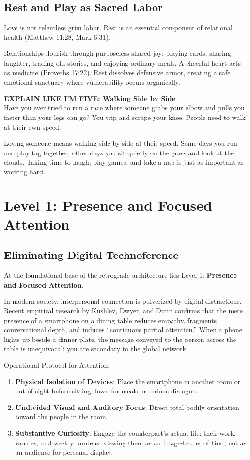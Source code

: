 \documentclass[11pt,twocolumn]{article}
\begin{document}
\subsection{Rest and Play as Sacred Labor}
Love is not relentless grim labor. Rest is an essential component of relational health (Matthew 11:28, Mark 6:31).

Relationships flourish through purposeless shared joy: playing cards, sharing laughter, trading old stories, and enjoying ordinary meals. A cheerful heart acts as medicine (Proverbs 17:22). Rest dissolves defensive armor, creating a safe emotional sanctuary where vulnerability occurs organically.

\begin{eli5box}
\textbf{EXPLAIN LIKE I'M FIVE: Walking Side by Side}\\
Have you ever tried to run a race where someone grabs your elbow and pulls you faster than your legs can go? You trip and scrape your knee. People need to walk at their own speed. 

Loving someone means walking side-by-side at their speed. Some days you run and play tag together; other days you sit quietly on the grass and look at the clouds. Taking time to laugh, play games, and take a nap is just as important as working hard.
\end{eli5box}

\section{Level 1: Presence and Focused Attention}

\subsection{Eliminating Digital Technoference}
At the foundational base of the retrograde architecture lies Level 1: \textbf{Presence and Focused Attention}.

In modern society, interpersonal connection is pulverized by digital distractions. Recent empirical research by Kushlev, Dwyer, and Dunn confirms that the mere presence of a smartphone on a dining table reduces empathy, fragments conversational depth, and induces ``continuous partial attention.'' When a phone lights up beside a dinner plate, the message conveyed to the person across the table is unequivocal: you are secondary to the global network.

Operational Protocol for Attention:
\begin{enumerate}
    \item \textbf{Physical Isolation of Devices}: Place the smartphone in another room or out of sight before sitting down for meals or serious dialogue.
    \item \textbf{Undivided Visual and Auditory Focus}: Direct total bodily orientation toward the people in the room.
    \item \textbf{Substantive Curiosity}: Engage the counterpart's actual life: their work, worries, and weekly burdens: viewing them as an image-bearer of God, not as an audience for personal display.
\end{enumerate}
\end{document}
